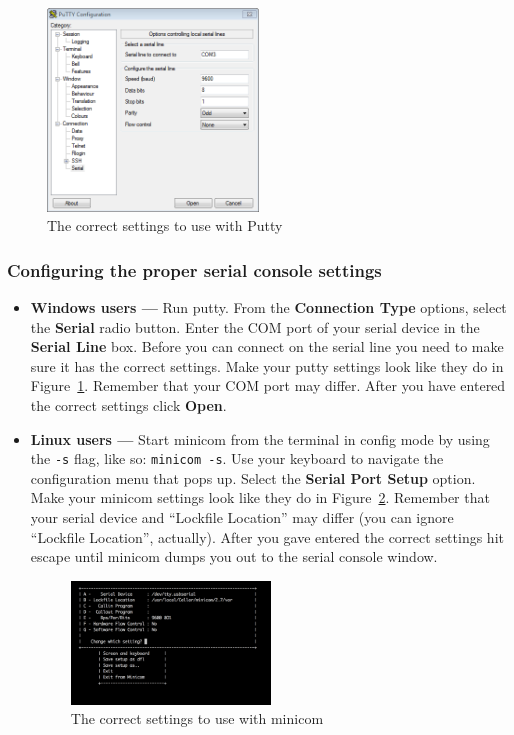 \documentclass[notitlepage]{article}
\begin{document}
\begin{figure}[ht!]
  \centering
  \includegraphics[width=0.5\textwidth]{fig0.png}
  \caption{The correct settings to use with Putty}
  \label{fig:putty}
\end{figure}

\subsubsection{Configuring the proper serial console settings}
\begin{itemize}
\item \textbf{Windows users --- }
  Run putty. From the \textbf{Connection Type} options, select the \textbf{Serial} radio button. Enter the COM port of your serial device in the \textbf{Serial Line} box. Before you can connect on the serial line you need to make sure it has the correct settings. Make your putty settings look like they do in Figure~\ref{fig:putty}. Remember that your COM port may differ. After you have entered the correct settings click \textbf{Open}.

\item \textbf{Linux users --- } Start minicom from the terminal in config mode by using the \texttt{-s} flag, like so: \texttt{minicom -s}. Use your keyboard to navigate the configuration menu that pops up. Select the \textbf{Serial Port Setup} option. Make your minicom settings look like they do in Figure~\ref{fig:minicom}. Remember that your serial device and ``Lockfile Location'' may differ (you can ignore ``Lockfile Location'', actually). After you gave entered the correct settings hit escape until minicom dumps you out to the serial console window.

\begin{figure}[ht!]
  \centering
  \includegraphics[width=0.5\textwidth]{fig1.png}
  \caption{The correct settings to use with minicom}
  \label{fig:minicom}
\end{figure}
\end{itemize}
\end{document}
